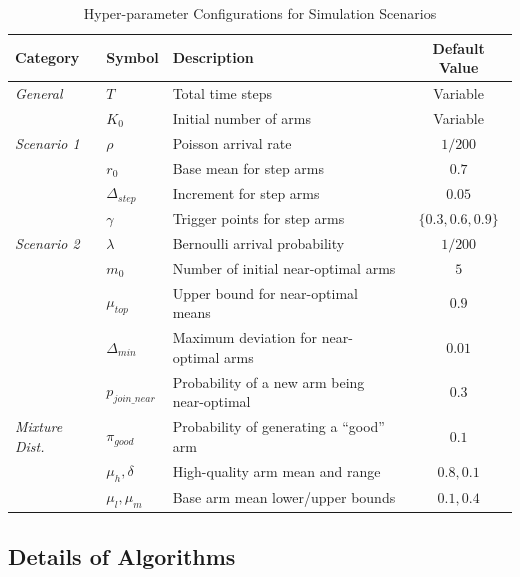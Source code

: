 \documentclass[11pt]{article}
\begin{document}
\begin{table}[htbp]
\centering
\caption{Hyper-parameter Configurations for Simulation Scenarios}
\label{tab:hyper-parameters}
\begin{tabular}{lllc}
\hline
\textbf{Category} & \textbf{Symbol} & \textbf{Description} & \textbf{Default Value} \\ \hline
\textit{General} & $T$ & Total time steps & Variable \\
& $K_0$ & Initial number of arms & Variable \\ \hline
\textit{Scenario 1} & $\rho$ & Poisson arrival rate & $1/200$ \\
& $r_0$ & Base mean for step arms & $0.7$ \\
& $\Delta_{step}$ & Increment for step arms & $0.05$ \\
& $\gamma$ & Trigger points for step arms & $\{0.3, 0.6, 0.9\}$ \\ \hline
\textit{Scenario 2} & $\lambda$ & Bernoulli arrival probability & $1/200$ \\
& $m_0$ & Number of initial near-optimal arms & $5$ \\
& $\mu_{top}$ & Upper bound for near-optimal means & $0.9$ \\
& $\Delta_{min}$ & Maximum deviation for near-optimal arms & $0.01$ \\
& $p_{join\_near}$ & Probability of a new arm being near-optimal & $0.3$ \\ \hline
\textit{Mixture Dist.} & $\pi_{good}$ & Probability of generating a ``good'' arm & $0.1$ \\
& $\mu_h, \delta$ & High-quality arm mean and range & $0.8, 0.1$ \\
& $\mu_l, \mu_m$ & Base arm mean lower/upper bounds & $0.1, 0.4$ \\ \hline
\end{tabular}
\end{table}

\newpage
\subsection{Details of Algorithms}
\end{document}
